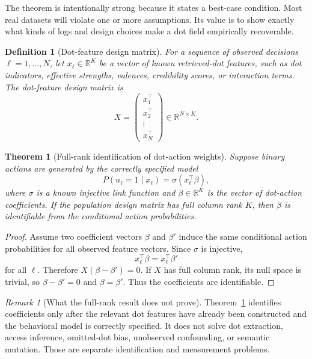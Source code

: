\documentclass[11pt]{article}
\newtheorem{definition}{Definition}
\newtheorem{theorem}{Theorem}
\theoremstyle{remark}
\newtheorem{remark}{Remark}
\begin{document}
The theorem is intentionally strong because it states a best-case
condition. Most real datasets will violate one or more assumptions. Its
value is to show exactly what kinds of logs and design choices make a
dot field empirically recoverable.

\begin{definition}[Dot-feature design matrix]\label{def:dot-feature-design-matrix}
For a sequence of observed decisions $\ell=1,\ldots,N$, let
$x_\ell\in\mathbb R^K$ be a vector of known retrieved-dot features, such
as dot indicators, effective strengths, valences, credibility scores,
or interaction terms. The dot-feature design matrix is
$$
X=\begin{pmatrix}
x_1^\top\\
x_2^\top\\
\vdots\\
x_N^\top
\end{pmatrix}\in\mathbb R^{N\times K}.
$$
\end{definition}

\begin{theorem}[Full-rank identification of dot-action weights]\label{thm:full-rank-dot-weight-identification}
Suppose binary actions are generated by the correctly specified model
$$
P(u_\ell=1\mid x_\ell)=\sigma(x_\ell^\top\beta),
$$
where $\sigma$ is a known injective link function and $\beta\in\mathbb R^K$
is the vector of dot-action coefficients. If the population design
matrix has full column rank $K$, then $\beta$ is identifiable from the
conditional action probabilities.
\end{theorem}

\begin{proof}
Assume two coefficient vectors $\beta$ and $\beta'$ induce the same
conditional action probabilities for all observed feature vectors. Since
$\sigma$ is injective,
$$
x_\ell^\top\beta=x_\ell^\top\beta'
$$
for all $\ell$. Therefore $X(\beta-\beta')=0$. If $X$ has full column
rank, its null space is trivial, so $\beta-\beta'=0$ and $\beta=\beta'$.
Thus the coefficients are identifiable.
\end{proof}

\begin{remark}[What the full-rank result does not prove]
Theorem~\ref{thm:full-rank-dot-weight-identification} identifies
coefficients only after the relevant dot features have already been
constructed and the behavioral model is correctly specified. It does not
solve dot extraction, access inference, omitted-dot bias, unobserved
confounding, or semantic mutation. Those are separate identification and
measurement problems.
\end{remark}
\end{document}
